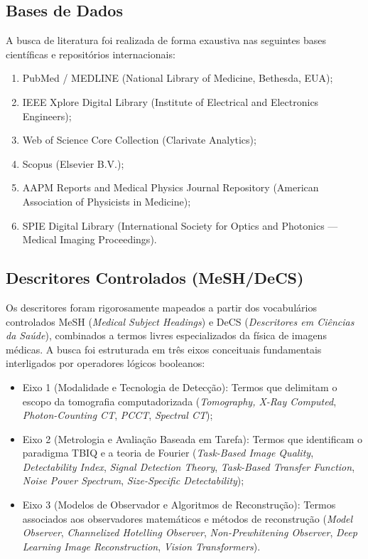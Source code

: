 \documentclass[
  12pt,
  a4paper,
  oneside
]{report}
\begin{document}
\subsection{Bases de Dados}
\label{subsec:bases_consultadas_detalhe}
A busca de literatura foi realizada de forma exaustiva nas seguintes bases científicas e repositórios internacionais:
\begin{enumerate}
  \item PubMed / MEDLINE (National Library of Medicine, Bethesda, EUA);
  \item IEEE Xplore Digital Library (Institute of Electrical and Electronics Engineers);
  \item Web of Science Core Collection (Clarivate Analytics);
  \item Scopus (Elsevier B.V.);
  \item AAPM Reports and Medical Physics Journal Repository (American Association of Physicists in Medicine);
  \item SPIE Digital Library (International Society for Optics and Photonics --- Medical Imaging Proceedings).
\end{enumerate}

\subsection{Descritores Controlados (MeSH/DeCS)}
\label{subsec:estruturacao_descritores}
Os descritores foram rigorosamente mapeados a partir dos vocabulários controlados MeSH (\emph{Medical Subject Headings}) e DeCS (\emph{Descritores em Ciências da Saúde}), combinados a termos livres especializados da física de imagens médicas. A busca foi estruturada em três eixos conceituais fundamentais interligados por operadores lógicos booleanos:
\begin{itemize}
  \item Eixo 1 (Modalidade e Tecnologia de Detecção): Termos que delimitam o escopo da tomografia computadorizada (\emph{Tomography, X-Ray Computed}, \emph{Photon-Counting CT}, \emph{PCCT}, \emph{Spectral CT});
  \item Eixo 2 (Metrologia e Avaliação Baseada em Tarefa): Termos que identificam o paradigma TBIQ e a teoria de Fourier (\emph{Task-Based Image Quality}, \emph{Detectability Index}, \emph{Signal Detection Theory}, \emph{Task-Based Transfer Function}, \emph{Noise Power Spectrum}, \emph{Size-Specific Detectability});
  \item Eixo 3 (Modelos de Observador e Algoritmos de Reconstrução): Termos associados aos observadores matemáticos e métodos de reconstrução (\emph{Model Observer}, \emph{Channelized Hotelling Observer}, \emph{Non-Prewhitening Observer}, \emph{Deep Learning Image Reconstruction}, \emph{Vision Transformers}).
\end{itemize}
\end{document}
